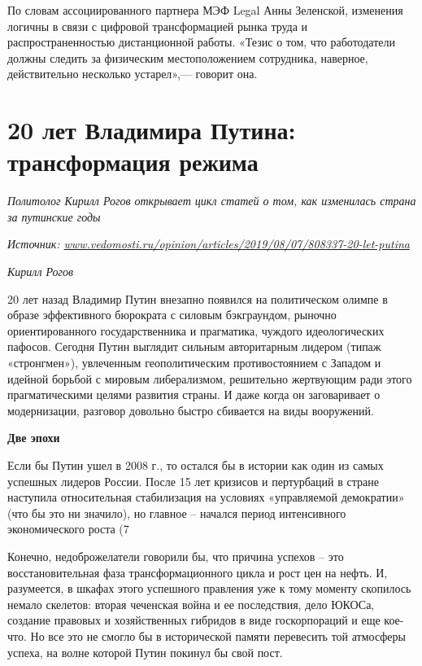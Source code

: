 По словам ассоциированного партнера МЭФ Legal Анны Зеленской, изменения логичны в связи с цифровой трансформацией рынка труда и распространенностью дистанционной работы. «Тезис о том, что работодатели должны следить за физическим местоположением сотрудника, наверное, действительно несколько устарел»,— говорит она.

\newpage
\section{20 лет Владимира Путина: трансформация режима}

\textit{Политолог Кирилл Рогов открывает цикл статей о том, как изменилась страна за путинские годы}

\textit{Источник: \url{www.vedomosti.ru/opinion/articles/2019/08/07/808337-20-let-putina}}

\textit{Кирилл Рогов }

20 лет назад Владимир Путин внезапно появился на политическом олимпе в образе эффективного бюрократа с силовым бэкграундом, рыночно ориентированного государственника и прагматика, чуждого идеологических пафосов. Сегодня Путин выглядит сильным авторитарным лидером (типаж «стронгмен»), увлеченным геополитическим противостоянием с Западом и идейной борьбой с мировым либерализмом, решительно жертвующим ради этого прагматическими целями развития страны. И даже когда он заговаривает о модернизации, разговор довольно быстро сбивается на виды вооружений.

\textbf{Две эпохи}



Если бы Путин ушел в 2008 г., то остался бы в истории как один из самых успешных лидеров России. После 15 лет кризисов и пертурбаций в стране наступила относительная стабилизация на условиях «управляемой демократии» (что бы это ни значило), но главное – начался период интенсивного экономического роста (7%

Конечно, недоброжелатели говорили бы, что причина успехов – это восстановительная фаза трансформационного цикла и рост цен на нефть. И, разумеется, в шкафах этого успешного правления уже к тому моменту скопилось немало скелетов: вторая чеченская война и ее последствия, дело ЮКОСа, создание правовых и хозяйственных гибридов в виде госкорпораций и еще кое-что. Но все это не смогло бы в исторической памяти перевесить той атмосферы успеха, на волне которой Путин покинул бы свой пост.

